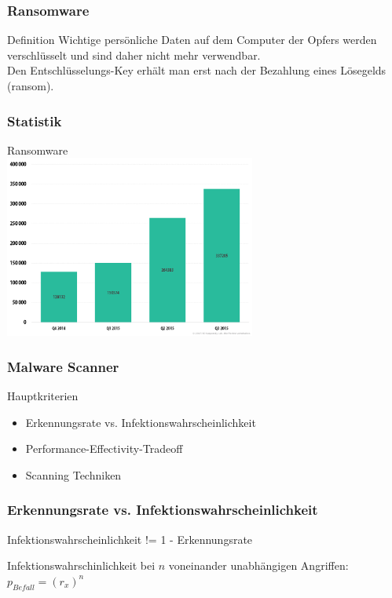 \documentclass{beamer}
\begin{document}
\begin{frame}
	\frametitle{Ransomware}
	\begin{block}{Definition}
		Wichtige persönliche Daten auf dem Computer der Opfers werden verschlüsselt und sind daher nicht mehr verwendbar.\\
		Den Entschlüsselungs-Key erhält man erst nach der Bezahlung eines Lösegelds (ransom).
	\end{block}
\end{frame}
	

\begin{frame}
\frametitle{Statistik}
Ransomware \\
\includegraphics[height=6cm]{bilder/ransom.png}

\end{frame}


\begin{frame}
	\frametitle{Malware Scanner}
	\begin{block}{Hauptkriterien}
	\begin{itemize}
		\item Erkennungsrate vs. Infektionswahrscheinlichkeit
		\item Performance-Effectivity-Tradeoff
		\item Scanning Techniken
	\end{itemize}
	\end{block}
\end{frame}

\begin{frame}
\frametitle{Erkennungsrate vs. Infektionswahrscheinlichkeit}
\begin{block}{}
	Infektionswahrscheinlichkeit != 1 - Erkennungsrate
\end{block}
Infektionswahrschinlichkeit bei $n$ voneinander unabhängigen Angriffen: \\
\centering
$p_{Befall} = (r_x)^n$
\end{frame}
\end{document}
